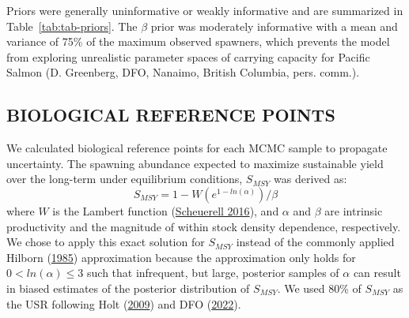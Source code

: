 \documentclass[11pt]{book}
\begin{document}
Priors were generally uninformative or weakly informative and are summarized in Table~\ref{tab:tab-priors}. The \(\beta\) prior was moderately informative with a mean and variance of 75\% of the maximum observed spawners, which prevents the model from exploring unrealistic parameter spaces of carrying capacity for Pacific Salmon (D. Greenberg, DFO, Nanaimo, British Columbia, pers. comm.).

\hypertarget{biological-reference-points}{%
\subsection{BIOLOGICAL REFERENCE POINTS}\label{biological-reference-points}}

We calculated biological reference points for each MCMC sample to propagate uncertainty. The spawning abundance expected to maximize sustainable yield over the long-term under equilibrium conditions, \(S_{MSY}\) was derived as:
\begin{equation}
S_{MSY} = 1 - W(e^{1-ln(\alpha)})/\beta
\label{eq:get-Smsy}
\end{equation}
where \(W\) is the Lambert function (\protect\hyperlink{ref-scheuerellExplicitSolutionCalculating2016}{Scheuerell 2016}), and \(\alpha\) and \(\beta\) are intrinsic productivity and the magnitude of within stock density dependence, respectively. We chose to apply this exact solution for \(S_{MSY}\) instead of the commonly applied Hilborn (\protect\hyperlink{ref-hilborn1985simplified}{1985}) approximation because the approximation only holds for \(0 <ln(\alpha) \leq3\) such that infrequent, but large, posterior samples of \(\alpha\) can result in biased estimates of the posterior distribution of \(S_{MSY}\). We used 80\% of \(S_{MSY}\) as the USR following Holt (\protect\hyperlink{ref-holtEvaluationBenchmarksConservation2009}{2009}) and DFO (\protect\hyperlink{ref-dfoSustainableFisheriesFramework2022}{2022}).
\end{document}
